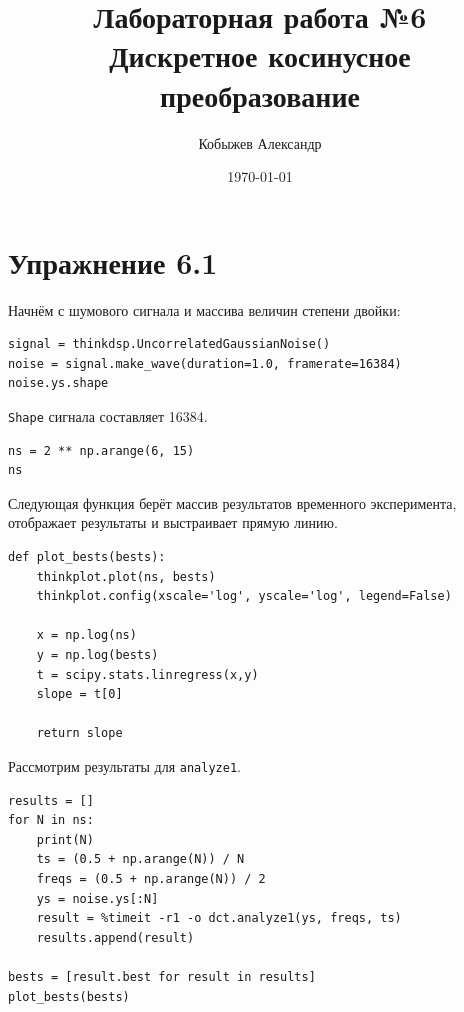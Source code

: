 \documentclass[a4paper,12pt]{report}
\title{Лабораторная работа №6\\Дискретное косинусное преобразование}
\author{Кобыжев Александр}
\date{\today}
\begin{document}
\maketitle
\tableofcontents
\listoffigures
\lstlistoflistings

\maketitle

\chapter{Упражнение 6.1}

Начнём с шумового сигнала и массива величин степени двойки:

\begin{lstlisting}[caption=Создание сигнала]
signal = thinkdsp.UncorrelatedGaussianNoise()
noise = signal.make_wave(duration=1.0, framerate=16384)
noise.ys.shape
\end{lstlisting}

\texttt{Shape} сигнала составляет 16384.

\begin{lstlisting}[caption=Массив степеней двойки]
ns = 2 ** np.arange(6, 15)
ns
\end{lstlisting}

Следующая функция берёт массив результатов временного эксперимента, отображает результаты и выстраивает прямую линию.

\begin{lstlisting}[caption=Функция \texttt{plot\_bests}]
def plot_bests(bests):    
    thinkplot.plot(ns, bests)
    thinkplot.config(xscale='log', yscale='log', legend=False)
    
    x = np.log(ns)
    y = np.log(bests)
    t = scipy.stats.linregress(x,y)
    slope = t[0]

    return slope
\end{lstlisting}

Рассмотрим результаты для \texttt{analyze1}.

\begin{lstlisting}[caption=Работа с \texttt{analyze1}]
results = []
for N in ns:
    print(N)
    ts = (0.5 + np.arange(N)) / N
    freqs = (0.5 + np.arange(N)) / 2
    ys = noise.ys[:N]
    result = %timeit -r1 -o dct.analyze1(ys, freqs, ts)
    results.append(result)

bests = [result.best for result in results]
plot_bests(bests)
\end{lstlisting}
\end{document}

